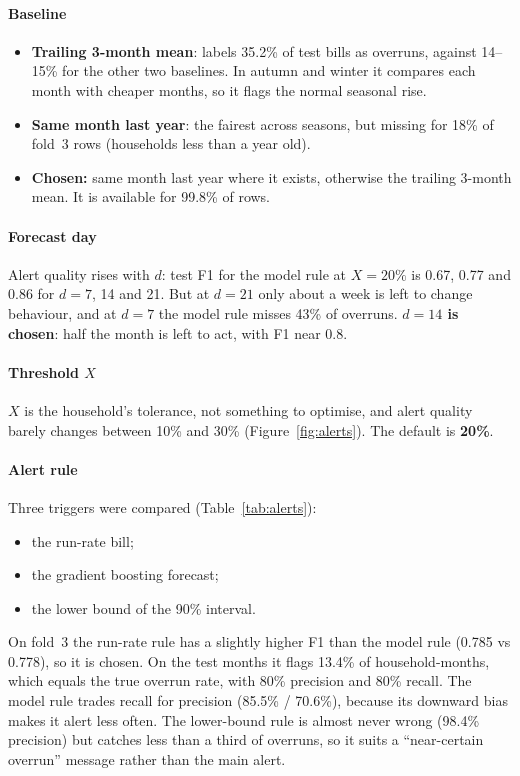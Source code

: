\documentclass[11pt,letterpaper]{article}
\begin{document}
\paragraph{Baseline}
\begin{itemize}
  \item \textbf{Trailing 3-month mean}: labels 35.2\% of test bills as overruns, against 14--15\% for the other two
  baselines. In autumn and winter it compares each month with cheaper months, so it flags the normal seasonal rise.
  \item \textbf{Same month last year}: the fairest across seasons, but missing for 18\% of fold~3 rows (households
  less than a year old).
  \item \textbf{Chosen:} same month last year where it exists, otherwise the trailing 3-month mean. It is
  available for 99.8\% of rows.
\end{itemize}

\paragraph{Forecast day} Alert quality rises with $d$: test F1 for the model rule at $X = 20\%$ is 0.67, 0.77 and
0.86 for $d = 7$, 14 and 21. But at $d = 21$ only about a week is left to change behaviour, and at $d = 7$ the
model rule misses 43\% of overruns. \textbf{$d = 14$ is chosen}: half the month is left to act, with F1 near 0.8.

\paragraph{Threshold $X$} $X$ is the household's tolerance, not something to optimise, and alert quality barely
changes between 10\% and 30\% (Figure~\ref{fig:alerts}). The default is \textbf{20\%}.

\paragraph{Alert rule} Three triggers were compared (Table~\ref{tab:alerts}):
\begin{itemize}
  \item the run-rate bill;
  \item the gradient boosting forecast;
  \item the lower bound of the 90\% interval.
\end{itemize}
On fold~3 the run-rate rule has a slightly higher F1 than the model rule (0.785 vs 0.778), so it is chosen. On the
test months it flags 13.4\% of household-months, which equals the true overrun rate, with 80\% precision and 80\%
recall. The model rule trades recall for precision (85.5\% / 70.6\%), because its downward bias makes it alert less
often. The lower-bound rule is almost never wrong (98.4\% precision) but catches less than a third of overruns, so
it suits a ``near-certain overrun'' message rather than the main alert.
\end{document}
